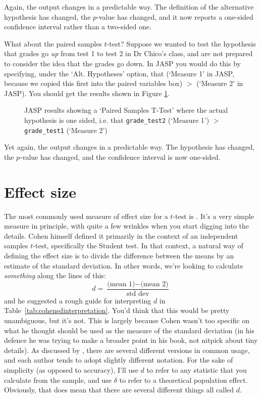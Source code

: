 Again, the output changes in a predictable way. The definition of the alternative hypothesis has changed, the $p$-value has changed, and it now reports a one-sided confidence interval rather than a two-sided one.

What about the paired samples $t$-test? Suppose we wanted to test the hypothesis that grades go {\it up} from test 1 to test 2 in Dr Chico's class, and are not prepared to consider the idea that the grades go down. In JASP you would do this by specifying, under the `Alt. Hypotheses' option, that  (`Measure 1' in JASP, because we copied this first into the paired variables box) $>$  (`Measure 2' in JASP). You should get the results shown in Figure \ref{fig:ttest_onesided3}.

\begin{figure}[htb]
\begin{center}
\caption{JASP results showing a `Paired Samples T-Test' where the actual hypothesis is one sided, i.e. that \texttt{grade\_test2} (`Measure 1') $>$ \texttt{grade\_test1} (`Measure 2')}
\label{fig:ttest_onesided3}
\HR
\end{center}
\end{figure}

Yet again, the output changes in a predictable way. The hypothesis has changed, the $p$-value has changed, and the confidence interval is now one-sided. 

\section{Effect size~\label{sec:cohensd}}

The most commonly used measure of effect size for a $t$-test is  \parencite{Cohen1988}. It's a very simple measure in principle, with quite a few wrinkles when you start digging into the details. Cohen himself defined it primarily in the context of an independent samples $t$-test, specifically the Student test. In that context, a natural way of defining the effect size is to divide the difference between the means by an estimate of the standard deviation. In other words, we're looking to calculate {\it something} along the lines of this:
$$
d = \frac{\mbox{(mean 1)} - \mbox{(mean 2)}}{\mbox{std dev}}
$$
and he suggested a rough guide for interpreting $d$ in Table~\ref{tab:cohensdinterpretation}. You'd think that this would be pretty unambiguous, but it's not. This is largely because Cohen wasn't too specific on what he thought should be used as the measure of the standard deviation (in his defence he was trying to make a broader point in his book, not nitpick about tiny details). As discussed by \textcite{McGrath2006}, there are several different versions in common usage, and each author tends to adopt slightly different notation. For the sake of simplicity (as opposed to accuracy), I'll use $d$ to refer to any statistic that you calculate from the sample, and  use $\delta$ to refer to a theoretical population effect. Obviously, that does mean that there are several different things all called $d$. 

